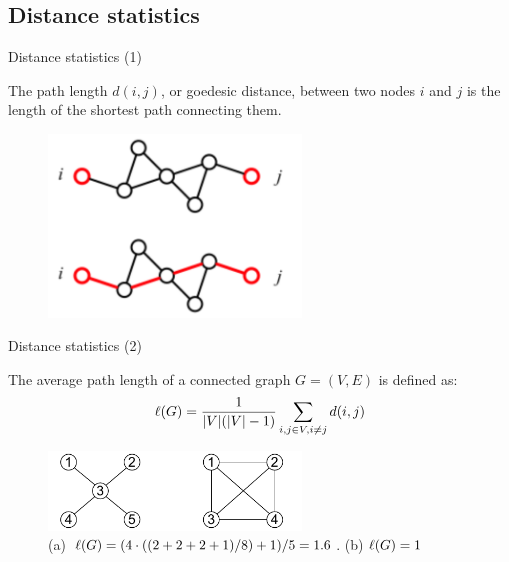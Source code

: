 \subsection{Distance statistics}

\begin{frame}{Distance statistics (1)}

\begin{definition}
The \alert{path length} $d(i,j)$, or \alert{goedesic distance}, between two nodes $i$ and $j$ is the length
of the shortest path connecting them. 
\end{definition}

\begin{figure}
\includegraphics[width=0.6\textwidth]{distance}
\end{figure}

\end{frame}

\begin{frame}{Distance statistics (2)}
	
\begin{definition}
The \alert{average path length} of a connected graph $G=(V,E)$ is defined as:
\[
  \ell(G) = \frac{1}{|V|(|V|-1)} \sum_{i,j \in V, i \neq j} d(i,j)
\]
\end{definition}

\begin{figure}
\includegraphics[width=0.6\textwidth]{diameter}
\caption{(a) $\ell(G) = (4 \cdot ((2+2+2+1)/8) + 1)/5=1.6$. (b) $\ell(G) = 1$}
\end{figure}

\end{frame}


